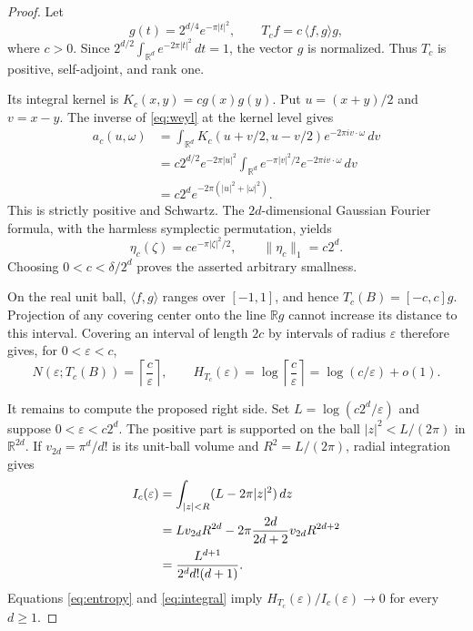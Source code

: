 \documentclass[11pt]{article}
\newcommand{\R}{\mathbb R}
\newcommand{\eps}{\varepsilon}
\newcommand{\ip}[2]{\langle #1,#2\rangle}
\begin{document}
\begin{proof}
Let
\[
g(t)=2^{d/4}e^{-\pi|t|^2},\qquad
T_c f=c\,\ip{f}{g}g,
\]
where $c>0$.  Since
$2^{d/2}\int_{\R^d}e^{-2\pi|t|^2}\,dt=1$, the vector $g$ is normalized.
Thus $T_c$ is positive, self-adjoint, and rank one.

Its integral kernel is $K_c(x,y)=cg(x)g(y)$.  Put $u=(x+y)/2$ and
$v=x-y$.  The inverse of \eqref{eq:weyl} at the kernel level gives
\begin{align*}
a_c(u,\omega)
&=\int_{\R^d}K_c(u+v/2,u-v/2)e^{-2\pi i v\cdot\omega}\,dv\\
&=c2^{d/2}e^{-2\pi|u|^2}
  \int_{\R^d}e^{-\pi|v|^2/2}e^{-2\pi i v\cdot\omega}\,dv\\
&=c2^d e^{-2\pi(|u|^2+|\omega|^2)}.
\end{align*}
This is strictly positive and Schwartz.  The $2d$-dimensional Gaussian
Fourier formula, with the harmless symplectic permutation, yields
\begin{equation}\label{eq:eta}
\eta_c(\zeta)=c e^{-\pi|\zeta|^2/2},
\qquad
\|\eta_c\|_1=c2^d.
\end{equation}
Choosing $0<c<\delta/2^d$ proves the asserted arbitrary smallness.

On the real unit ball, $\ip{f}{g}$ ranges over $[-1,1]$, and hence
$T_c(B)=[-c,c]g$.  Projection of any covering center onto the line $\R g$
cannot increase its distance to this interval.  Covering an interval of
length $2c$ by intervals of radius $\eps$ therefore gives, for
$0<\eps<c$,
\begin{equation}\label{eq:entropy}
N(\eps;T_c(B))=\left\lceil\frac c\eps\right\rceil,
\qquad
H_{T_c}(\eps)=\log\left\lceil\frac c\eps\right\rceil
=\log(c/\eps)+o(1).
\end{equation}

It remains to compute the proposed right side.  Set
$L=\log(c2^d/\eps)$ and suppose $0<\eps<c2^d$.  The positive part is
supported on the ball $|z|^2<L/(2\pi)$ in $\R^{2d}$.  If
$v_{2d}=\pi^d/d!$ is its unit-ball volume and
$R^2=L/(2\pi)$, radial integration gives
\begin{align}
I_c(\eps)
&=\int_{|z|<R}(L-2\pi|z|^2)\,dz\notag\\
&=L v_{2d}R^{2d}-2\pi\frac{2d}{2d+2}v_{2d}R^{2d+2}\notag\\
&=\frac{L^{d+1}}{2^d d!(d+1)}.\label{eq:integral}
\end{align}
Equations \eqref{eq:entropy} and \eqref{eq:integral} imply
$H_{T_c}(\eps)/I_c(\eps)\to0$ for every $d\ge1$.
\end{proof}
\end{document}
